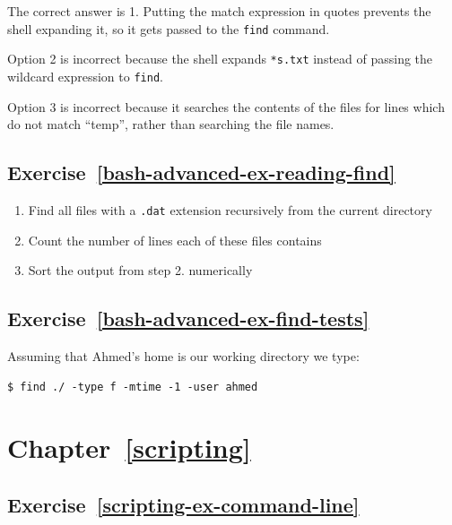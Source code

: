\documentclass[
]{krantz}
\providecommand{\tightlist}{%
  \setlength{\itemsep}{0pt}\setlength{\parskip}{0pt}}
\begin{document}
The correct answer is 1. Putting the match expression in quotes prevents the shell
expanding it, so it gets passed to the \texttt{find} command.

Option 2 is incorrect because the shell expands \texttt{*s.txt} instead of passing the wildcard
expression to \texttt{find}.

Option 3 is incorrect because it searches the contents of the files for lines which
do not match ``temp'', rather than searching the file names.

\hypertarget{exercise-refbash-advanced-ex-reading-find}{%
\subsection*{Exercise~\ref{bash-advanced-ex-reading-find}}\label{exercise-refbash-advanced-ex-reading-find}}


\begin{enumerate}
\def\labelenumi{\arabic{enumi}.}
\tightlist
\item
  Find all files with a \texttt{.dat} extension recursively from the current directory
\item
  Count the number of lines each of these files contains
\item
  Sort the output from step 2. numerically
\end{enumerate}

\hypertarget{exercise-refbash-advanced-ex-find-tests}{%
\subsection*{Exercise~\ref{bash-advanced-ex-find-tests}}\label{exercise-refbash-advanced-ex-find-tests}}


Assuming that Ahmed's home is our working directory we type:

\begin{verbatim}
$ find ./ -type f -mtime -1 -user ahmed
\end{verbatim}

\hypertarget{chapter-refscripting}{%
\section*{Chapter~\ref{scripting}}\label{chapter-refscripting}}

\hypertarget{exercise-refscripting-ex-command-line}{%
\subsection*{Exercise~\ref{scripting-ex-command-line}}\label{exercise-refscripting-ex-command-line}}
\end{document}

